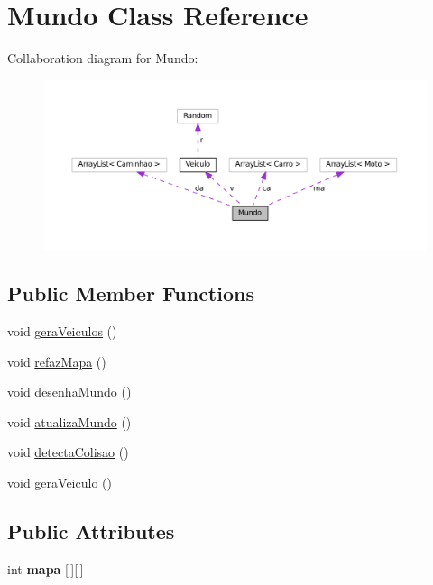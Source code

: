 \hypertarget{classMundo}{}\section{Mundo Class Reference}
\label{classMundo}


Collaboration diagram for Mundo\+:\nopagebreak
\begin{figure}[H]
\begin{center}
\leavevmode
\includegraphics[width=350pt]{classMundo__coll__graph}
\end{center}
\end{figure}
\subsection*{Public Member Functions}
\begin{DoxyCompactItemize}
\item 
void \hyperlink{classMundo_a6793ddedae676faa577ac3545dc4a190}{gera\+Veiculos} ()
\item 
void \hyperlink{classMundo_a500511141a45b1b95301612109703f02}{refaz\+Mapa} ()
\item 
void \hyperlink{classMundo_adbafcb32f5f209eda97e1c7953c6e599}{desenha\+Mundo} ()
\item 
void \hyperlink{classMundo_ab2de7a750f9e410a7e10ac707b5bf500}{atualiza\+Mundo} ()
\item 
void \hyperlink{classMundo_ac5525a65a2bc9c8b333c6594aa9503ca}{detecta\+Colisao} ()
\item 
void \hyperlink{classMundo_a96be554c9f3734a55b27b10bae5f6527}{gera\+Veiculo} ()
\end{DoxyCompactItemize}
\subsection*{Public Attributes}
\begin{DoxyCompactItemize}
\item 
int {\bfseries mapa} \mbox{[}$\,$\mbox{]}\mbox{[}$\,$\mbox{]}
\end{DoxyCompactItemize}


